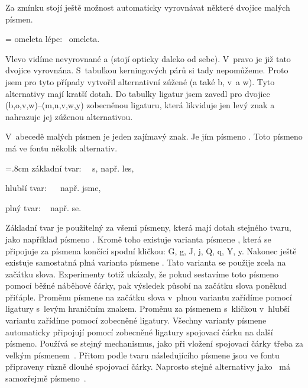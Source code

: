 Za zmínku stojí ještě možnost automaticky vyrovnávat některé dvojice malých
písmen.

{\baselineskip=1cm \lineskiplimit=-1cm  \def\\{\hfil\break}
\leftskip=\parindent  \noindent
{\slabikar o\noboundary\kern0pt\noboundary meleta } lépe:
{\slabikar\ omeleta.}
\par\bigskip}

Vlevo vidíme nevyrovnané  a  (stojí opticky daleko od sebe).
V~pravo je již tato dvojice vyrovnána. S~tabulkou kerningových párů si tady
nepomůžeme. Proto jsem pro tyto případy vytvořil alternativní zúžené 
(a také b, v~a w). Tyto alternativy mají kratší dotah. Do tabulky ligatur
jsem zavedl pro dvojice \hbox{(b,o,v,w)--(m,n,v,w,y)} zobecněnou ligaturu,
která likviduje jen levý znak a nahrazuje jej zúženou alternativou.

V~abecedě malých písmen je jeden zajímavý znak. Je jím písmeno .
Toto písmeno má ve fontu několik alternativ. 

{\baselineskip=.8cm \lineskiplimit=-1cm 
základní tvar:  {\slabikar\ \ \ukaz s},       např. {\slabikar les}, 

hlubší tvar:    {\slabikar\ \ } např. {\slabikar jsme},

plný tvar:      {\slabikar\ } např. {\slabikar se}.
\par\bigskip}

Základní tvar je použitelný za všemi písmeny, která mají
dotah stejného tvaru, jako například písmeno . Kromě toho existuje
 varianta písmene , která se připojuje za písmena končící
spodní kličkou: G, g, J, j, Q, q, Y, y.  Nakonec ještě existuje samostatná
plná varianta písmene . Tato varianta se použije
zcela na začátku slova. Experimenty totiž ukázaly, že pokud sestavíme toto
písmeno pomocí běžné náběhové čárky, pak výsledek působí na začátku slova
poněkud přiťáple. Proměnu písmene  na začátku slova v~plnou variantu
zařídíme pomocí ligatury s~levým hraničním znakem. Proměnu za písmenem
s~kličkou v~hlubší variantu zařídíme pomocí zobecněné ligatury. Všechny
varianty písmene  automaticky připojují pomocí zobecněné ligatury
spojovací čárku na další písmeno. Používá se stejný mechanismus, jako při
vložení spojovací čárky třeba za velkým písmenem~. Přitom podle tvaru
následujícího písmene jsou ve fontu připraveny různě dlouhé spojovací
čárky. Naprosto stejné alternativy jako~ má samozřejmě
písmeno~.


